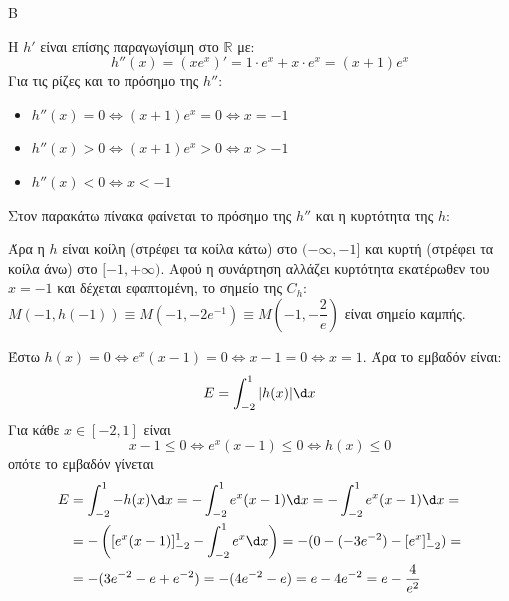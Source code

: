 \begin{thema}{Β}
\begin{erwthma}
\item Η $h'$ είναι επίσης παραγωγίσιμη στο $\mathbb{R}$ με:
\[h''(x) = (xe^x)' = 1\cdot e^x + x\cdot e^x = (x+1)e^x\]
Για τις ρίζες και το πρόσημο της $h''$:
\begin{itemize}
    \item $h''(x) = 0 \Leftrightarrow (x+1)e^x = 0 \Leftrightarrow x = -1$
    \item $h''(x) > 0 \Leftrightarrow (x+1)e^x > 0 \Leftrightarrow x > -1$
    \item $h''(x) < 0 \Leftrightarrow x < -1$
\end{itemize}
Στον παρακάτω πίνακα φαίνεται το πρόσημο της $h''$ και η κυρτότητα της $h$:
\begin{center}
\end{center}
Άρα η $h$ είναι κοίλη (στρέφει τα κοίλα κάτω) στο $(-\infty, -1]$ και κυρτή (στρέφει τα κοίλα άνω) στο $[-1, +\infty)$.
Αφού η συνάρτηση αλλάζει κυρτότητα εκατέρωθεν του $x = -1$ και δέχεται εφαπτομένη, το σημείο της $C_h$: $M(-1, h(-1)) \equiv M(-1, -2e^{-1}) \equiv M\left(-1, -\dfrac{2}{e}\right)$ είναι σημείο καμπής.

\item Έστω $h(x)=0\Leftrightarrow e^x(x-1)=0\Leftrightarrow x-1=0\Leftrightarrow x=1$.
Άρα το εμβαδόν είναι:
\[ E = \int_{-2}^{1} |h(x)| \d x \]
Για κάθε $x\in[-2,1]$ είναι
\[x-1\leq 0\Leftrightarrow e^x(x-1)\leq 0\Leftrightarrow h(x)\leq 0\]
οπότε το εμβαδόν γίνεται
\begin{align*}
E&= \int_{-2}^{1} -h(x) \d x = -\int_{-2}^{1} e^x(x-1) \d x = -\int_{-2}^{1} e^x(x-1) \d x =\\&= -\left( [e^x(x-1)]_{-2}^{1} - \int_{-2}^{1} e^x \d x \right) = - ( 0 - (-3e^{-2}) - [e^x]_{-2}^{1} )=\\&= -(3e^{-2} - e + e^{-2}) = - (4e^{-2} - e) = e - 4e^{-2} = e - \dfrac{4}{e^2}
\end{align*}

\end{erwthma}
\end{thema}


